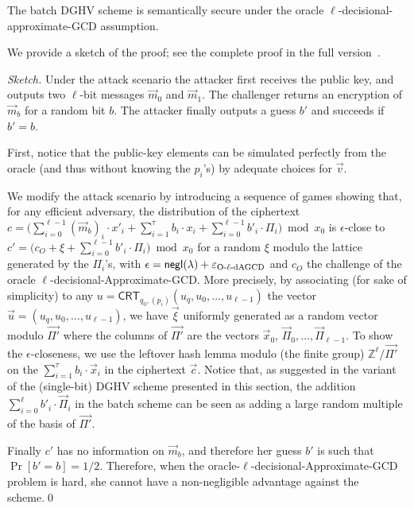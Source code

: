 \documentclass[11pt]{llncs}
\newcommand{\Z}{{\mathbb Z}}
\newcommand*{\crt}{\ensuremath{\mathsf{CRT}}}
\begin{document}
\begin{theorem}\label{thm:l-dAGC}
The batch DGHV scheme is semantically secure under the
oracle $\ell$-decisional-approximate-GCD assumption.
\end{theorem}

We provide a sketch of the proof; see the complete proof in the full version~\cite{CLT2013a}.
\begin{proof}[Sketch]
Under the attack scenario the attacker first receives the public key, and outputs two $\ell$-bit messages $\vec m_0$ and $\vec m_1$. The challenger returns an encryption of $\vec m_b$ for a random bit $b$. The attacker finally outputs a guess $b'$ and succeeds if $b' = b$.

First, notice that the public-key elements can be simulated perfectly from the oracle 
(and thus without knowing the $p_i$'s) by adequate choices for $\vec v$.

We modify the attack scenario by introducing a sequence of games showing that,
for any efficient adversary, the distribution of the ciphertext $c=\big(
\sum_{i=0}^{\ell-1}(\vec m_b)_i\cdot x'_i+\sum_{i=1}^\tau b_i\cdot
x_i+\sum_{i=0}^{\ell-1}b'_i \cdot \varPi_i\big)\bmod x_0$ is
$\epsilon$-close to $c'=\big(c_O+\xi+\sum_{i=0}^{\ell-1}b'_i\cdot \varPi_i\big)\bmod
x_0$ for a random $\xi$ modulo the lattice generated by the $\varPi_i$'s, with
$\epsilon = {\sf negl}(\lambda)+\varepsilon_{\text{O-$\ell$-dAGCD}}$ and $c_O$
the challenge of the oracle $\ell$-decisional-Approximate-GCD. More precisely,
by associating (for sake of simplicity) to any $u=\crt_{q_0,(p_i)}(u_q,u_0,\ldots,u_{\ell-1})$ the
vector $\vec u=(u_q,u_0,\ldots,u_{\ell-1})$, we have $\vec \xi$ uniformly generated
as a random vector modulo $\vec{\Pi'}$ where the columns of $\vec{\Pi'}$ are
the vectors $\vec x_0$, $\vec \varPi_0,\ldots,\vec\varPi_{\ell-1}$. To show
the $\epsilon$-closeness, we use the leftover hash lemma modulo (the finite group) $\Z^\ell/\vec{\Pi'}$
on the $\sum_{i=1}^\tau b_i\cdot \vec x_i$ in the ciphertext $\vec c$. Notice that, as suggested in the variant of the (single-bit) DGHV scheme presented in this section, the addition $\sum_{i=0}^\ell b'_i\cdot \vec\varPi_i$ in the batch scheme can be seen as adding a large random multiple of the basis of $\vec {\Pi'}$.

Finally $c'$ has no information on $\vec m_b$, and therefore her guess $b'$ 
is such that $\Pr[b'=b]=1/2$. Therefore, when the oracle-$\ell$-decisional-Approximate-GCD 
problem is hard, she cannot have a non-negligible advantage against the scheme.\qed\end{proof}
\end{document}
